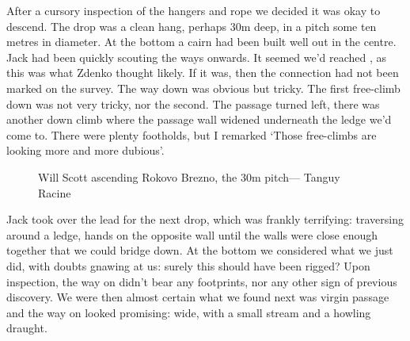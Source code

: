 After a cursory inspection of the hangers and rope we decided it was okay to descend. The drop was a clean hang, perhaps 30m deep, in a pitch some ten metres in diameter. At the bottom a cairn had been built well out in the centre. Jack had been quickly scouting the ways onwards. It seemed we'd reached , as this was what Zdenko thought likely. If it was, then the connection had not been marked on the survey. The way down was obvious but tricky. The first free-climb down was not very tricky, nor the second. The passage turned left, there was another down climb where the passage wall widened underneath the ledge we'd come to. There were plenty footholds, but I remarked `Those free-climbs are looking more and more dubious'. 

\begin{figure}[t!]
\centering
{}
\caption{Will Scott ascending Rokovo Brezno, the 30m pitch--- Tanguy Racine}
\label{Rokovobrezno}
\end{figure}

Jack took over the lead for the next drop, which was frankly terrifying: traversing around a ledge, hands on the opposite wall until the walls were close enough together that we could bridge down. At the bottom we considered what we just did, with doubts gnawing at us: surely this should have been rigged? Upon inspection, the way on didn't bear any footprints, nor any other sign of previous discovery. We were then almost certain what we found next was virgin passage and the way on looked promising: wide, with a small stream and a howling draught.

